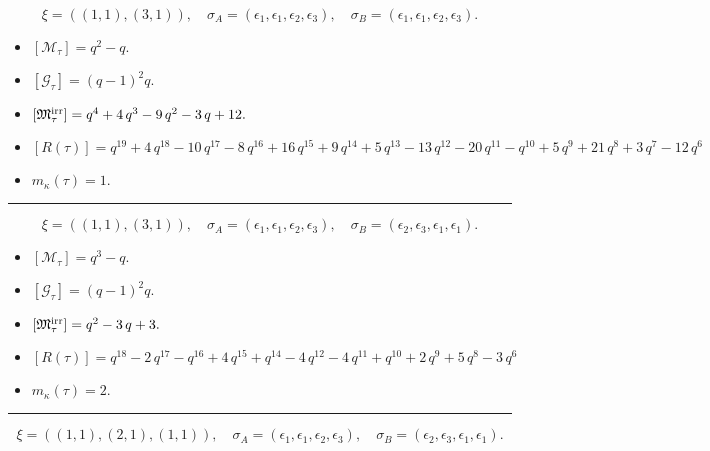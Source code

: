 \documentclass[10pt,a4paper]{amsart}
\begin{document}
$$\xi = ({(1, 1)}, {(3, 1)}),\quad \sigma_A = ({{\epsilon_1}}, {{\epsilon_1, \epsilon_2, \epsilon_3}}),\quad \sigma_B = ({{\epsilon_1}}, {{\epsilon_1, \epsilon_2, \epsilon_3}}).$$

\begin{itemize}
 \item $[\mathcal{M}_{\tau}] = q^{2} - q .$

 \item $[\mathcal{G}_{\tau}] = {\left(q - 1\right)}^{2} q .$

 \item $[{\frak M}_{\tau}^{\textrm{irr}}] = q^{4} + 4 \, q^{3} - 9 \, q^{2} - 3 \, q + 12 .$

 \item $[R(\tau)] = q^{19} + 4 \, q^{18} - 10 \, q^{17} - 8 \, q^{16} + 16 \, q^{15} + 9 \, q^{14} + 5 \, q^{13} - 13 \, q^{12} - 20 \, q^{11} - q^{10} + 5 \, q^{9} + 21 \, q^{8} + 3 \, q^{7} - 12 \, q^{6} $

 \item $m_{\kappa}(\tau) = 1 .$

 \end{itemize}
\noindent\rule{8cm}{0.4pt}

$$\xi = ({(1, 1)}, {(3, 1)}),\quad \sigma_A = ({{\epsilon_1}}, {{\epsilon_1, \epsilon_2, \epsilon_3}}),\quad \sigma_B = ({{\epsilon_2}}, {{\epsilon_3, \epsilon_1, \epsilon_1}}).$$

\begin{itemize}
 \item $[\mathcal{M}_{\tau}] = q^{3} - q .$

 \item $[\mathcal{G}_{\tau}] = {\left(q - 1\right)}^{2} q .$

 \item $[{\frak M}_{\tau}^{\textrm{irr}}] = q^{2} - 3 \, q + 3 .$

 \item $[R(\tau)] = q^{18} - 2 \, q^{17} - q^{16} + 4 \, q^{15} + q^{14} - 4 \, q^{12} - 4 \, q^{11} + q^{10} + 2 \, q^{9} + 5 \, q^{8} - 3 \, q^{6} $

 \item $m_{\kappa}(\tau) = 2 .$

 \end{itemize}
\noindent\rule{8cm}{0.4pt}

$$\xi = ({(1, 1)}, {(2, 1), (1, 1)}),\quad \sigma_A = ({{\epsilon_1}}, {{\epsilon_1, \epsilon_2}, {\epsilon_3}}),\quad \sigma_B = ({{\epsilon_2}}, {{\epsilon_3, \epsilon_1}, {\epsilon_1}}).$$
\end{document}
